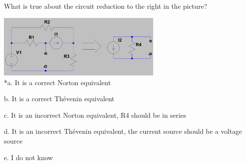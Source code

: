 
What is true about the circuit reduction to the right in the picture?

\includegraphics[width=3.20299in,height=1.23438in]{../../Images/TheveninNortonQ6.png} \\


*a. It is a correct Norton equivalent

b. It is a correct Thévenin equivalent

c. It is an incorrect Norton equivalent, R4 should be in series

d. It is an incorrect Thévenin equivalent, the current source should be a voltage source

e. I do not know \\
